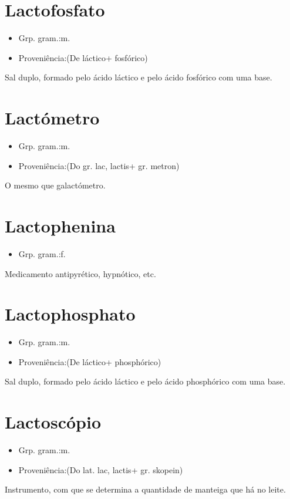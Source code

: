 \section{Lactofosfato}
\begin{itemize}
\item {Grp. gram.:m.}
\end{itemize}
\begin{itemize}
\item {Proveniência:(De \textunderscore láctico\textunderscore  + \textunderscore fosfórico\textunderscore )}
\end{itemize}
Sal duplo, formado pelo ácido láctico e pelo ácido fosfórico com uma base.
\section{Lactómetro}
\begin{itemize}
\item {Grp. gram.:m.}
\end{itemize}
\begin{itemize}
\item {Proveniência:(Do gr. \textunderscore lac\textunderscore , \textunderscore lactis\textunderscore  + gr. \textunderscore metron\textunderscore )}
\end{itemize}
O mesmo que \textunderscore galactómetro\textunderscore .
\section{Lactophenina}
\begin{itemize}
\item {Grp. gram.:f.}
\end{itemize}
Medicamento antipyrético, hypnótico, etc.
\section{Lactophosphato}
\begin{itemize}
\item {Grp. gram.:m.}
\end{itemize}
\begin{itemize}
\item {Proveniência:(De \textunderscore láctico\textunderscore  + \textunderscore phosphórico\textunderscore )}
\end{itemize}
Sal duplo, formado pelo ácido láctico e pelo ácido phosphórico com uma base.
\section{Lactoscópio}
\begin{itemize}
\item {Grp. gram.:m.}
\end{itemize}
\begin{itemize}
\item {Proveniência:(Do lat. \textunderscore lac\textunderscore , \textunderscore lactis\textunderscore  + gr. \textunderscore skopein\textunderscore )}
\end{itemize}
Instrumento, com que se determina a quantidade de manteiga que há no leite.
